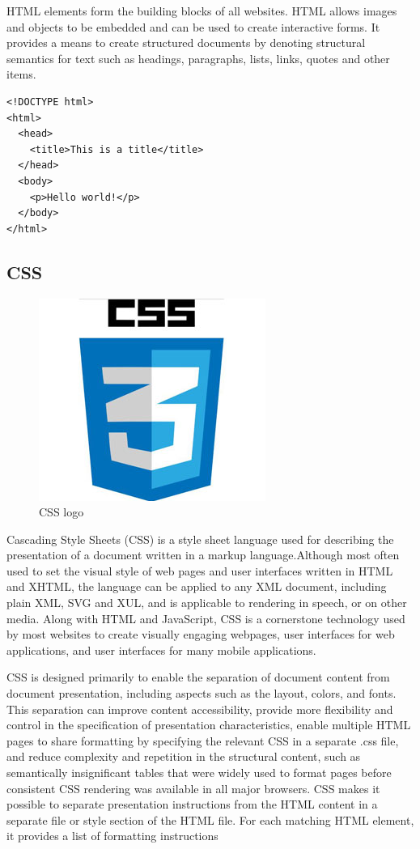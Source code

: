 HTML elements form the building blocks of all websites. HTML allows images and objects to be embedded and can be used to create interactive forms. It provides a means to create structured documents by denoting structural semantics for text such as headings, paragraphs, lists, links, quotes and other items.

\begin{verbatim}
<!DOCTYPE html>
<html>
  <head>
    <title>This is a title</title>
  </head>
  <body>
    <p>Hello world!</p>
  </body>
</html>

\end{verbatim}


\subsection{CSS}

\begin{figure}[h!]
\centering \includegraphics[scale=3]{input/images/CSS.jpg}
\caption{CSS logo}
\end{figure}
Cascading Style Sheets (CSS) is a style sheet language used for describing the presentation of a document written in a markup language.Although most often used to set the visual style of web pages and user interfaces written in HTML and XHTML, the language can be applied to any XML document, including plain XML, SVG and XUL, and is applicable to rendering in speech, or on other media. Along with HTML and JavaScript, CSS is a cornerstone technology used by most websites to create visually engaging webpages, user interfaces for web applications, and user interfaces for many mobile applications.


CSS is designed primarily to enable the separation of document content from document presentation, including aspects such as the layout, colors, and fonts. This separation can improve content accessibility, provide more flexibility and control in the specification of presentation characteristics, enable multiple HTML pages to share formatting by specifying the relevant CSS in a separate .css file, and reduce complexity and repetition in the structural content, such as semantically insignificant tables that were widely used to format pages before consistent CSS rendering was available in all major browsers. CSS makes it possible to separate presentation instructions from the HTML content in a separate file or style section of the HTML file. For each matching HTML element, it provides a list of formatting instructions


